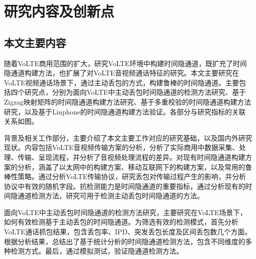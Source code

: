 \section{研究内容及创新点}
\label{sec:intro:work}

\subsection{本文主要内容}
\label{sec:intro:work:mainwork}

随着VoLTE商用范围的扩大，研究VoLTE环境中构建时间隐通道，既扩充了时间隐通道构建方法，也扩展了对VoLTE音视频通话特征的研究。本文主要研究在VoLTE视频通话场景下，通过主动丢包的方式，构建鲁棒的时间隐通道。主要包括四个研究点，分别为面向VoLTE中主动丢包时间隐通道的检测方法研究、基于Zigzag映射矩阵的时间隐通道构建方法研究、基于多重校验的时间隐通道构建方法研究，以及基于Linphone的时间隐通道构建方法验证。各部分与研究指标的关联关系如图。


背景及相关工作部分，主要介绍了本文主要工作对应的研究基础，以及国内外研究现状。内容包括VoLTE音视频传输方案的分析，分析了实际商用中数据采集、处理、传输、呈现流程，并分析了音视频处理流程的差异。对现有时间隐通道构建方案的分析，涵盖了以太网中的构建方案、移动互联网下的构建方案，以及常用的鲁棒性策略。通过分析VoLTE传输协议，研究丢包对传输过程产生的影响，并分析协议中有效的随机字段。抗检测能力是时间隐通道的重要指标，通过分析现有的时间隐通道检测方法，研究可用于检测主动丢包时间隐通道的方法。

面向VoLTE中主动丢包时间隐通道的检测方法研究，主要研究在VoLTE场景下，如何有效检测基于主动丢包的时间隐通道。为筛选有效的检测模式，首先分析VoLTE通话抓包结果，包含丢包率、IPD、突发丢包长度及区间丢包数几个方面。根据分析结果，总结出了基于统计分析的时间隐通道检测方法，包含不同维度的多种检测方式。最后，通过模拟测试，验证隐通道检测方法。

